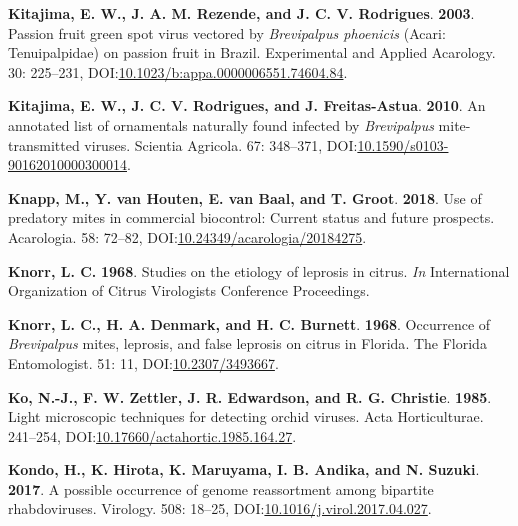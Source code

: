 \documentclass[12pt,final,CPage]{ufthesis}
\newlength{\cslhangindent}
\newenvironment{CSLReferences}[2] %
{%
	\setlength{\parindent}{0pt}
	\ifodd #1 \everypar{\setlength{\hangindent}{\cslhangindent}}\ignorespaces\fi
	\ifnum #2 > 0
	\setlength{\parskip}{#2\baselineskip}
	\fi
}%
{}
\begin{document}
{\begin{CSLReferences}{1}{0}
  \leavevmode{}%
  \textbf{Kitajima, E. W., J. A. M. Rezende, and J. C. V. Rodrigues}. \textbf{2003}. {Passion fruit green spot virus} vectored by {\emph{Brevipalpus phoenicis}} ({Acari}: {Tenuipalpidae}) on passion fruit in {Brazil}. Experimental and Applied Acarology. 30: 225--231, DOI:\href{https://doi.org/10.1023/b:appa.0000006551.74604.84}{10.1023/b:appa.0000006551.74604.84}.

  \leavevmode{}%
  \textbf{Kitajima, E. W., J. C. V. Rodrigues, and J. Freitas-Astua}. \textbf{2010}. An annotated list of ornamentals naturally found infected by {\emph{Brevipalpus}} mite-transmitted viruses. Scientia Agricola. 67: 348--371, DOI:\href{https://doi.org/10.1590/s0103-90162010000300014}{10.1590/s0103-90162010000300014}.

  \leavevmode{}%
  \textbf{Knapp, M., Y. van Houten, E. van Baal, and T. Groot}. \textbf{2018}. Use of predatory mites in commercial biocontrol: Current status and future prospects. Acarologia. 58: 72--82, DOI:\href{https://doi.org/10.24349/acarologia/20184275}{10.24349/acarologia/20184275}.

  \leavevmode{}%
  \textbf{Knorr, L. C.} \textbf{1968}. Studies on the etiology of leprosis in citrus. \emph{In} International Organization of Citrus Virologists Conference Proceedings.

  \leavevmode{}%
  \textbf{Knorr, L. C., H. A. Denmark, and H. C. Burnett}. \textbf{1968}. Occurrence of {\emph{Brevipalpus}} mites, leprosis, and false leprosis on citrus in {Florida}. The Florida Entomologist. 51: 11, DOI:\href{https://doi.org/10.2307/3493667}{10.2307/3493667}.

  \leavevmode{}%
  \textbf{Ko, N.-J., F. W. Zettler, J. R. Edwardson, and R. G. Christie}. \textbf{1985}. Light microscopic techniques for detecting orchid viruses. Acta Horticulturae. 241--254, DOI:\href{https://doi.org/10.17660/actahortic.1985.164.27}{10.17660/actahortic.1985.164.27}.

  \leavevmode{}%
  \textbf{Kondo, H., K. Hirota, K. Maruyama, I. B. Andika, and N. Suzuki}. \textbf{2017}. A possible occurrence of genome reassortment among bipartite rhabdoviruses. Virology. 508: 18--25, DOI:\href{https://doi.org/10.1016/j.virol.2017.04.027}{10.1016/j.virol.2017.04.027}.


\end{CSLReferences}}
\end{document}
